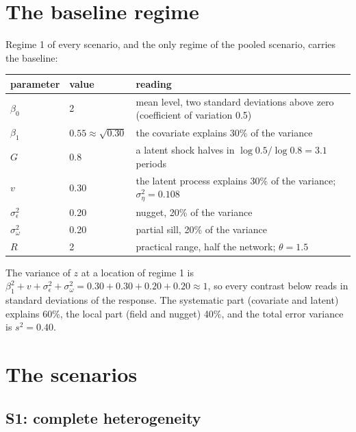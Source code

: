 \documentclass[11pt]{article}
\begin{document}
\section{The baseline regime}\label{sec:base}

Regime 1 of every scenario, and the only regime of the pooled scenario, carries the baseline:
\begin{center}
\begin{tabular}{ll>{\raggedright\arraybackslash}p{9.2cm}}
\toprule
parameter & value & reading \\
\midrule
$\beta_0$ & 2 & mean level, two standard deviations above zero (coefficient of variation 0.5) \\
$\beta_1$ & $0.55 \approx \sqrt{0.30}$ & the covariate explains 30\% of the variance \\
$G$ & 0.8 & a latent shock halves in $\log 0.5/\log 0.8 = 3.1$ periods \\
$v$ & 0.30 & the latent process explains 30\% of the variance; $\sigma^2_\eta = 0.108$ \\
$\sigma^2_\epsilon$ & 0.20 & nugget, 20\% of the variance \\
$\sigma^2_\omega$ & 0.20 & partial sill, 20\% of the variance \\
$R$ & 2 & practical range, half the network; $\theta = 1.5$ \\
\bottomrule
\end{tabular}
\end{center}
The variance of $z$ at a location of regime 1 is $\beta_1^2 + v + \sigma^2_\epsilon + \sigma^2_\omega = 0.30 + 0.30 + 0.20 + 0.20 \approx 1$, so every contrast below reads in standard deviations of the response. The systematic part (covariate and latent) explains 60\%, the local part (field and nugget) 40\%, and the total error variance is $s^2 = 0.40$.

\section{The scenarios}\label{sec:scen}

\subsection{S1: complete heterogeneity}
\end{document}
